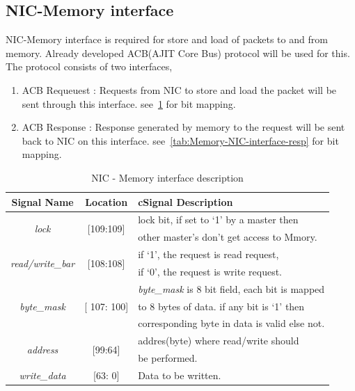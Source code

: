 \documentclass[a4paper,11pt, final]{report}
\begin{document}
		\subsection{NIC-Memory interface}
			NIC-Memory interface is required for store and load of packets to and from memory. Already developed ACB(AJIT Core Bus) protocol will be used for this.
			The protocol consists of two interfaces,
			\begin{enumerate}
				\item ACB Requeuest : Requests from NIC to store and load the packet will be sent through this interface. see~\ref{tab:NIC-Memory-interface-req} for bit mapping.
				\item ACB Response : Response generated by memory to the request will be sent back to NIC on this interface. see~\ref{tab:Memory-NIC-interface-resp} for bit mapping.
			\end{enumerate}

				\begin{table}[!htbp]
					\centering
					\begin{tabular}{ccl}
						\hline
						\textbf{Signal Name} 			& \textbf{Location} 		&{c}\textbf{Signal Description}  \\ \hline
						\multirow{2}{*}{\textit{lock}}		& \multirow{2}{*}{[109:109]}	& lock bit, if set to `1' by a master then\\
											&				& other master's don't get access to Mmory.\\ \hline
						\multirow{2}{*}{\textit{read/write\_bar}}& \multirow{2}{*}{[108:108]}	& if `1', the request is read request,\\ 
											& 				& if `0', the request is write request.\\ \hline
						\multirow{3}{*}{\textit{byte\_mask}}	& \multirow{3}{*}{[ 107: 100]}	& \textit{byte\_mask} is 8 bit field, each bit is mapped\\
											&				& to 8 bytes of data. if any bit is `1' then\\
											& 				& corresponding byte in data is valid else not.\\ \hline 
						\multirow{2}{*}{\textit{address}}   	& \multirow{2}{*}{[99:64]} 	& addres(byte) where read/write should\\ 
											&				& be performed.\\ \hline
						\textit{write\_data}   			& [63: 0] 			& Data to be written.\\ \hline
					\end{tabular}
					\caption{NIC - Memory interface description}
					\label{tab:NIC-Memory-interface-req}
				\end{table}
\end{document}
